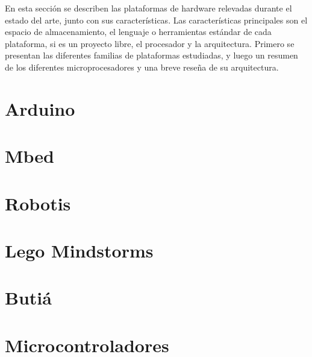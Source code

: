 
  En esta sección se describen las plataformas de hardware relevadas
durante el estado del arte, junto con sus características.
  Las características principales son el espacio de almacenamiento,
el lenguaje o herramientas estándar de cada plataforma, si es un
proyecto libre, el procesador y la arquitectura.
  Primero se presentan las diferentes familias de plataformas
estudiadas, y luego un resumen de los diferentes microprocesadores
y una breve reseña de su arquitectura.

\section{Arduino}


\section{Mbed}


\section{Robotis}


\section{Lego Mindstorms}


%

\section{Butiá}


\section{Microcontroladores}

